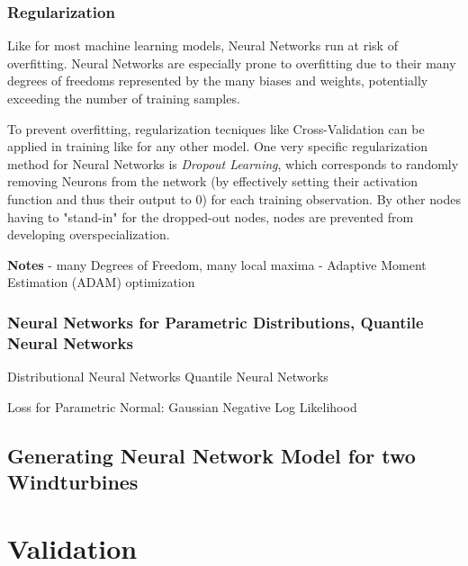  \subsubsection{Regularization}
 
 Like for most machine learning models, Neural Networks run at risk of overfitting. Neural Networks are especially prone to overfitting due to their many degrees of freedoms represented by the many biases and weights, potentially exceeding the number of training samples.

 To prevent overfitting, regularization tecniques like Cross-Validation can be applied in training like for any other model. One very specific regularization method for Neural Networks is \textit{Dropout Learning}, which corresponds to randomly removing Neurons from the network (by effectively setting their activation function and thus their output to 0) for each training observation. By other nodes having to "stand-in" for the dropped-out nodes, nodes are prevented from developing overspecialization. \cite{James2023}



\textbf{Notes}
- many Degrees of Freedom, many local maxima
- Adaptive Moment Estimation (ADAM) optimization

\subsubsection{Neural Networks for Parametric Distributions, Quantile Neural Networks}


Distributional Neural Networks
Quantile Neural Networks

Loss for Parametric Normal: Gaussian Negative Log Likelihood


\subsection{Generating Neural Network Model for two Windturbines}

\section{Validation}